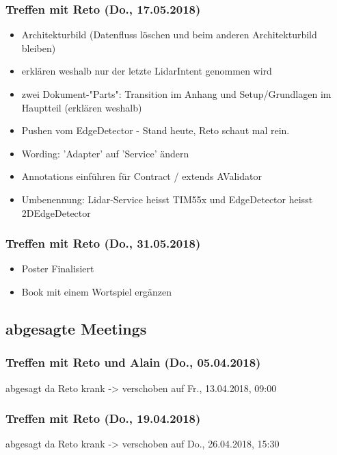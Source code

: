 \subsubsection{Treffen mit Reto (Do., 17.05.2018)}
\begin{itemize}
	\item Architekturbild (Datenfluss löschen und beim anderen Architekturbild bleiben)
	\item erklären weshalb nur der letzte LidarIntent genommen wird
	\item zwei Dokument-"Parts": Transition im Anhang und Setup/Grundlagen im Hauptteil (erklären weshalb)
	\item Pushen vom EdgeDetector - Stand heute, Reto schaut mal rein.
	\item Wording: 'Adapter' auf 'Service' ändern
	\item Annotations einführen für Contract / extends AValidator
	\item Umbenennung: Lidar-Service heisst TIM55x und EdgeDetector heisst 2DEdgeDetector
\end{itemize}

\subsubsection{Treffen mit Reto (Do., 31.05.2018)}
\begin{itemize}
	\item Poster Finalisiert
	\item Book mit einem Wortspiel ergänzen
\end{itemize}

\subsection{abgesagte Meetings}
\subsubsection{Treffen mit Reto und Alain (Do., 05.04.2018)}
abgesagt da Reto krank -> verschoben auf Fr., 13.04.2018, 09:00

\subsubsection{Treffen mit Reto (Do., 19.04.2018)}
abgesagt da Reto krank -> verschoben auf Do., 26.04.2018, 15:30

